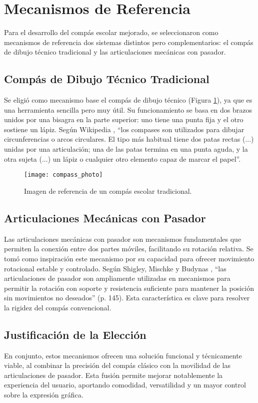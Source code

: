 \documentclass[11pt, a4paper]{article}
\begin{document}
\section{Mecanismos de Referencia}
\label{sec:referencias}
Para el desarrollo del compás escolar mejorado, se seleccionaron como mecanismos de referencia dos sistemas distintos pero complementarios: el compás de dibujo técnico tradicional y las articulaciones mecánicas con pasador.

\subsection{Compás de Dibujo Técnico Tradicional}
Se eligió como mecanismo base el compás de dibujo técnico (Figura \ref{fig:ref_compas}), ya que es una herramienta sencilla pero muy útil. Su funcionamiento se basa en dos brazos unidos por una bisagra en la parte superior: uno tiene una punta fija y el otro sostiene un lápiz.
Según Wikipedia \cite{wikipedia_utensilios}, “los compases son utilizados para dibujar circunferencias o arcos circulares. El tipo más habitual tiene dos patas rectas (...) unidas por una articulación; una de las patas termina en una punta aguda, y la otra sujeta (...) un lápiz o cualquier otro elemento capaz de marcar el papel”.

\begin{figure}[H]
    \centering
    \texttt{[image: compass\_photo]}
    \caption{Imagen de referencia de un compás escolar tradicional.}
    \label{fig:ref_compas}
\end{figure}

\subsection{Articulaciones Mecánicas con Pasador}
Las articulaciones mecánicas con pasador son mecanismos fundamentales que permiten la conexión entre dos partes móviles, facilitando su rotación relativa. Se tomó como inspiración este mecanismo por su capacidad para ofrecer movimiento rotacional estable y controlado.
Según Shigley, Mischke y Budynas \cite{shigley_design}, “las articulaciones de pasador son ampliamente utilizadas en mecanismos para permitir la rotación con soporte y resistencia suficiente para mantener la posición sin movimientos no deseados” (p. 145). Esta característica es clave para resolver la rigidez del compás convencional.

\subsection{Justificación de la Elección}
En conjunto, estos mecanismos ofrecen una solución funcional y técnicamente viable, al combinar la precisión del compás clásico con la movilidad de las articulaciones de pasador. Esta fusión permite mejorar notablemente la experiencia del usuario, aportando comodidad, versatilidad y un mayor control sobre la expresión gráfica.
\end{document}
